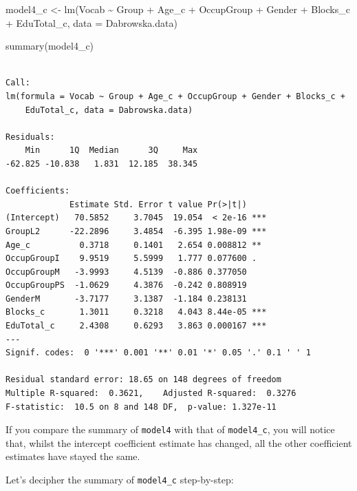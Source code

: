 \documentclass[
  letterpaper,
  DIV=11,
  numbers=noendperiod]{scrreprt}
\newenvironment{Shaded}{\begin{snugshade}}{\end{snugshade}}
\newcommand{\AttributeTok}[1]{\textcolor[rgb]{0.40,0.45,0.13}{#1}}
\newcommand{\FunctionTok}[1]{\textcolor[rgb]{0.28,0.35,0.67}{#1}}
\newcommand{\NormalTok}[1]{\textcolor[rgb]{0.00,0.23,0.31}{#1}}
\newcommand{\OtherTok}[1]{\textcolor[rgb]{0.00,0.23,0.31}{#1}}
\newcommand{\SpecialCharTok}[1]{\textcolor[rgb]{0.37,0.37,0.37}{#1}}
\begin{document}
\begin{Shaded}
\begin{Highlighting}[]
\NormalTok{model4\_c }\OtherTok{\textless{}{-}} \FunctionTok{lm}\NormalTok{(Vocab }\SpecialCharTok{\textasciitilde{}}\NormalTok{ Group }\SpecialCharTok{+}\NormalTok{ Age\_c }\SpecialCharTok{+}\NormalTok{ OccupGroup }\SpecialCharTok{+}\NormalTok{ Gender }\SpecialCharTok{+}\NormalTok{ Blocks\_c }\SpecialCharTok{+}\NormalTok{ EduTotal\_c, }
             \AttributeTok{data =}\NormalTok{ Dabrowska.data)}

\FunctionTok{summary}\NormalTok{(model4\_c)}
\end{Highlighting}
\end{Shaded}

\begin{verbatim}

Call:
lm(formula = Vocab ~ Group + Age_c + OccupGroup + Gender + Blocks_c + 
    EduTotal_c, data = Dabrowska.data)

Residuals:
    Min      1Q  Median      3Q     Max 
-62.825 -10.838   1.831  12.185  38.345 

Coefficients:
             Estimate Std. Error t value Pr(>|t|)    
(Intercept)   70.5852     3.7045  19.054  < 2e-16 ***
GroupL2      -22.2896     3.4854  -6.395 1.98e-09 ***
Age_c          0.3718     0.1401   2.654 0.008812 ** 
OccupGroupI    9.9519     5.5999   1.777 0.077600 .  
OccupGroupM   -3.9993     4.5139  -0.886 0.377050    
OccupGroupPS  -1.0629     4.3876  -0.242 0.808919    
GenderM       -3.7177     3.1387  -1.184 0.238131    
Blocks_c       1.3011     0.3218   4.043 8.44e-05 ***
EduTotal_c     2.4308     0.6293   3.863 0.000167 ***
---
Signif. codes:  0 '***' 0.001 '**' 0.01 '*' 0.05 '.' 0.1 ' ' 1

Residual standard error: 18.65 on 148 degrees of freedom
Multiple R-squared:  0.3621,    Adjusted R-squared:  0.3276 
F-statistic:  10.5 on 8 and 148 DF,  p-value: 1.327e-11
\end{verbatim}

If you compare the summary of \texttt{model4} with that of
\texttt{model4\_c}, you will notice that, whilst the intercept
coefficient estimate has changed, all the other coefficient estimates
have stayed the same.

Let's decipher the summary of \texttt{model4\_c} step-by-step:
\end{document}
